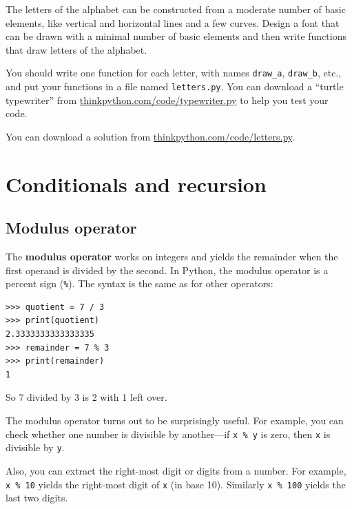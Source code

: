 \documentclass[10pt]{book}
\begin{document}
\begin{ex}

The letters of the alphabet can be constructed from a moderate
number of basic elements, like vertical and horizontal lines
and a few curves.  Design a font that can be drawn with a
minimal number of basic elements and then write functions
that draw letters of the alphabet.

You should write one function for each letter, with names
\verb"draw_a", \verb"draw_b", etc., and put your functions
in a file named {\tt letters.py}.  You can download a
``turtle typewriter'' from \url{thinkpython.com/code/typewriter.py}
to help you test your code.

You can download a solution from \url{thinkpython.com/code/letters.py}.

\end{ex}



\chapter{Conditionals and recursion}

\section{Modulus operator}


The {\bf modulus operator} works on integers and yields the remainder
when the first operand is divided by the second.  In Python, the
modulus operator is a percent sign (\verb"%").  The syntax is the same
as for other operators:

\beforeverb
\begin{verbatim}
>>> quotient = 7 / 3
>>> print(quotient)
2.3333333333333335
>>> remainder = 7 % 3
>>> print(remainder)
1
\end{verbatim}
\afterverb
%
So 7 divided by 3 is 2 with 1 left over.

The modulus operator turns out to be surprisingly useful.  For
example, you can check whether one number is divisible by another---if
{\tt x \% y} is zero, then {\tt x} is divisible by {\tt y}.


Also, you can extract the right-most digit
or digits from a number.  For example, {\tt x \% 10} yields the
right-most digit of {\tt x} (in base 10).  Similarly {\tt x \% 100}
yields the last two digits.
\end{document}
